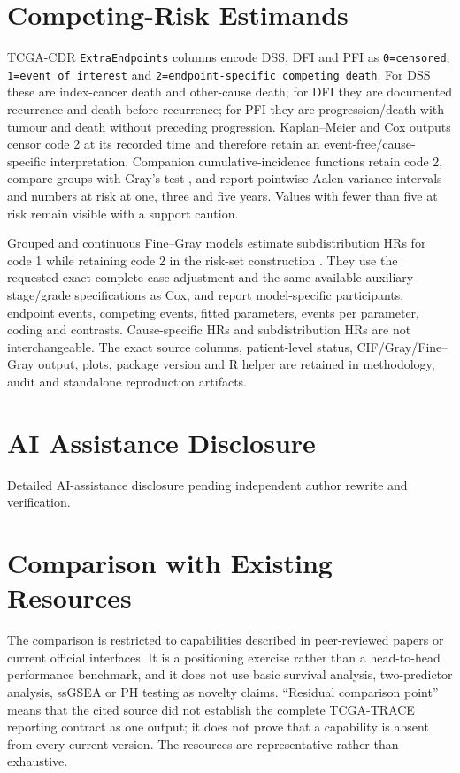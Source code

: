 \documentclass[12pt]{article}
\begin{document}
\section*{Competing-Risk Estimands}

TCGA-CDR \texttt{ExtraEndpoints} columns encode DSS, DFI and PFI as
\texttt{0=censored}, \texttt{1=event of interest} and
\texttt{2=endpoint-specific competing death}. For DSS these are index-cancer
death and other-cause death; for DFI they are documented recurrence and death
before recurrence; for PFI they are progression/death with tumour and death
without preceding progression. Kaplan--Meier and Cox outputs censor code 2 at
its recorded time and therefore retain an event-free/cause-specific
interpretation. Companion cumulative-incidence functions retain code 2,
compare groups with Gray's test \citep{gray1988}, and report pointwise
Aalen-variance intervals and numbers at risk at one, three and five years.
Values with fewer than five at risk remain visible with a support caution.

Grouped and continuous Fine--Gray models estimate subdistribution HRs for code
1 while retaining code 2 in the risk-set construction
\citep{fineGray1999}. They use the requested exact complete-case adjustment
and the same available auxiliary stage/grade specifications as Cox, and report
model-specific participants, endpoint events, competing events, fitted
parameters, events per parameter, coding and contrasts. Cause-specific HRs and
subdistribution HRs are not interchangeable. The exact source columns,
patient-level status, CIF/Gray/Fine--Gray output, plots, package version and R
helper are retained in methodology, audit and standalone reproduction
artifacts.

\section*{AI Assistance Disclosure}

Detailed AI-assistance disclosure pending independent author rewrite and verification.

\section*{Comparison with Existing Resources}

The comparison is restricted to capabilities described in peer-reviewed papers
or current official interfaces. It is a positioning exercise rather than a
head-to-head performance benchmark, and it does not use basic survival
analysis, two-predictor analysis, ssGSEA or PH testing as novelty claims.
``Residual comparison point'' means that the cited source did not establish the
complete TCGA-TRACE reporting contract as one output; it does not prove that a
capability is absent from every current version. The resources are
representative rather than exhaustive.
\end{document}
